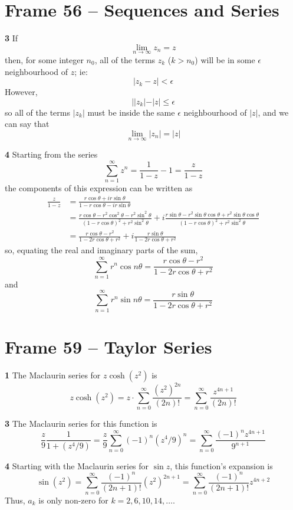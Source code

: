 \documentclass{article}
\begin{document}
\section{Frame 56 -- Sequences and Series}

\textbf{3}
If
\[
	\lim_{n \to \infty} z_n = z
\]
then, for some integer $n_0$, all of the terms $z_k$ ($k > n_0$) will be in some $\epsilon$ neighbourhood of $z$; ie:
\[
	|z_k - z| < \epsilon
\]
However,
\[
	||z_k| - |z| \le \epsilon
\]
so all of the terms $|z_k|$ must be inside the same $\epsilon$ neighbourhood of $|z|$, and we can say that
\[
	\lim_{n \to \infty} |z_n| = |z|
\]

\textbf{4}
Starting from the series
\[
	\sum_{n=1}^\infty z^n = \frac{1}{1 - z} - 1 = \frac{z}{1 - z}
\]
the components of this expression can be written as
\begin{align*}
	\frac{z}{1 - z}
	&= \frac{r \cos \theta + i r \sin \theta}{1 - r \cos \theta - i r \sin \theta} \\
	&= \frac{r\cos \theta - r^2 \cos^2 \theta - r^2 \sin^2 \theta}{(1 - r\cos \theta)^2 + r^2 \sin^2 \theta}
	+ i \frac{r\sin \theta - r^2 \sin \theta \cos \theta + r^2 \sin \theta \cos \theta}{(1 - r\cos \theta)^2 + r^2 \sin^2 \theta} \\
	&= \frac{r \cos \theta - r^2}{1 - 2r\cos \theta + r^2}
	+ i\frac{r\sin \theta}{1 - 2r\cos \theta + r^2}
\end{align*}
so, equating the real and imaginary parts of the sum,
\[
	\sum_{n=1}^\infty r^n \cos n\theta
	= \frac{r \cos \theta - r^2}{1 - 2r\cos \theta + r^2}
\]
and
\[
	\sum_{n=1}^\infty r^n \sin n\theta
	= \frac{r\sin \theta}{1 - 2r\cos \theta + r^2}
\]


\clearpage
\section{Frame 59 -- Taylor Series}
\textbf{1}
The Maclaurin series for $z \cosh(z^2)$ is
\[
	z \cosh(z^2)
	= z \cdot \sum_{n=0}^\infty \frac{(z^2)^{2n}}{(2n)!}
	= \sum_{n=0}^\infty \frac{z^{4n+1}}{(2n)!}
\]

\textbf{3}
The Maclaurin series for this function is
\[
	\frac{z}{9} \frac{1}{1 + (z^4/9)}
	= \frac{z}{9} \sum_{n=0}^\infty (-1)^n (z^4/9)^n
	= \sum_{n=0}^\infty \frac{(-1)^n z^{4n+1}}{9^{n+1}}
\]

\textbf{4}
Starting with the Maclaurin series for $\sin z$, this function's expansion is
\[
	\sin(z^2)
	= \sum_{n=0}^\infty \frac{(-1)^n}{(2n+1)!} (z^2)^{2n + 1}
	= \sum_{n=0}^\infty \frac{(-1)^n}{(2n+1)!} z^{4n+2}
\]
Thus, $a_k$ is only non-zero for $k = 2, 6, 10, 14, \dots$.
\end{document}
